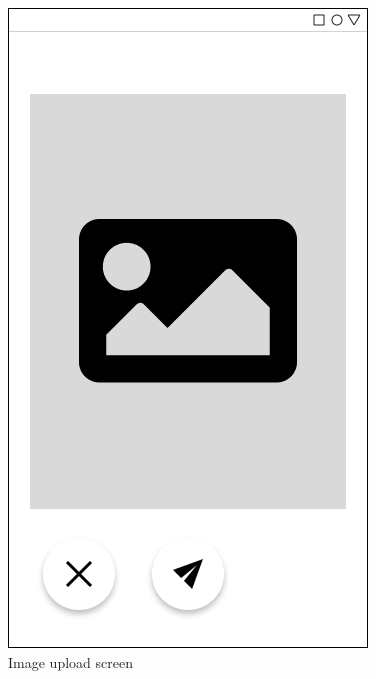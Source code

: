 \documentclass[12pt, a4paper]{article}
\begin{document}
\begin{figure}[h]
    \centering
    \setlength{\fboxsep}{8pt}
    \includegraphics[scale=0.45, fbox]{Upload.png}
    \caption{Image upload screen}
    \label{fig:upload}
\end{figure}
\end{document}
